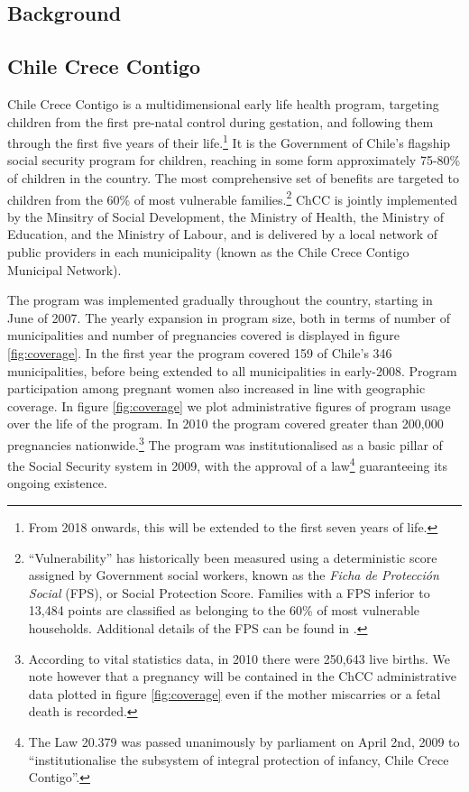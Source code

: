 \documentclass[12pt]{article}
\begin{document}
\begin{spacing}{1.4}
\section{Background}
\subsection{Chile Crece Contigo}
Chile Crece Contigo is a multidimensional early life health program,
targeting children from the first pre-natal control during gestation, and
following them through the first
five years of their life.\footnote{From 2018 onwards, this will be extended
  to the first seven years of life.}  It is the Government of Chile's
flagship social security program for
children, reaching in some form approximately 75-80\% of children in
the country.  The most comprehensive set of benefits are targeted to
children from the 60\% of most vulnerable families.\footnote{
  ``Vulnerability'' has historically been measured using a deterministic
  score assigned by Government social workers, known as the \emph{Ficha
    de Protecci\'on Social} (FPS), or Social Protection Score.  Families
  with a FPS inferior to 13,484 points are classified as belonging to
  the 60\% of most vulnerable households.  Additional details of the FPS
  can be found in \citet{Herreraetal2010}.}  ChCC is jointly implemented
by the Minsitry of Social Development, the Ministry of Health, the
Ministry of Education, and the Ministry of Labour, and is delivered by
a local network of public providers in each municipality (known as the
Chile Crece Contigo Municipal Network).

The program was implemented gradually throughout the country, starting
in June of 2007.  The yearly expansion in program size, both in terms of
number of municipalities and number of pregnancies covered is displayed
in figure \ref{fig:coverage}. In
the first year the program covered 159 of Chile's 346 municipalities,
before being extended to all municipalities in early-2008.  Program
participation among pregnant women also increased in line with geographic
coverage.  In figure \ref{fig:coverage} we plot administrative figures of
program usage over the life of the program.  In 2010 the program covered
greater than 200,000 pregnancies nationwide.\footnote{According to vital
  statistics data, in 2010 there were 250,643 live births.  We note
  however that a pregnancy will be contained in the ChCC administrative
  data plotted in figure \ref{fig:coverage} even if the mother miscarries
  or a fetal death is recorded.}
The program was institutionalised as a basic
pillar of the Social Security system in 2009, with the approval of a
law\footnote{The Law 20.379 was passed unanimously by parliament on
  April 2nd, 2009 to ``institutionalise the subsystem of integral
  protection of infancy, Chile Crece Contigo''.} guaranteeing its
ongoing existence.


\end{spacing}
\end{document}
